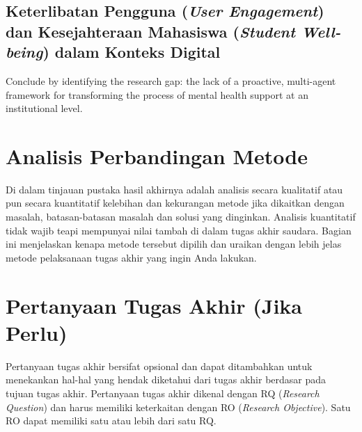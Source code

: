 \subsection{Keterlibatan Pengguna (\textit{User Engagement}) dan Kesejahteraan Mahasiswa (\textit{Student Well-being}) dalam Konteks Digital}
\label{subsec:teori_engagement_wellbeing_detail_revised}
Conclude by identifying the research gap: the lack of a proactive, multi-agent framework for transforming the process of mental health support at an institutional level.


\section{Analisis Perbandingan Metode}
\label{sec:analisis_metode_revised}

Di dalam tinjauan pustaka hasil akhirnya adalah analisis secara kualitatif atau pun secara kuantitatif kelebihan dan kekurangan metode jika dikaitkan dengan masalah, batasan-batasan masalah dan solusi yang dinginkan. Analisis kuantitatif tidak wajib teapi mempunyai nilai tambah di dalam tugas akhir saudara. Bagian ini menjelaskan kenapa metode tersebut dipilih dan uraikan dengan lebih jelas metode pelaksanaan tugas akhir yang ingin Anda lakukan. 

\section{Pertanyaan Tugas Akhir (Jika Perlu)}
\label{sec:pertanyaan_ta_revised}

Pertanyaan tugas akhir bersifat opsional dan dapat ditambahkan untuk menekankan hal-hal yang hendak diketahui dari tugas akhir berdasar pada tujuan tugas akhir. Pertanyaan tugas akhir dikenal dengan RQ (\textit{Research Question}) dan harus memiliki keterkaitan dengan RO (\textit{Research Objective}). Satu RO dapat memiliki satu atau lebih dari satu RQ.
